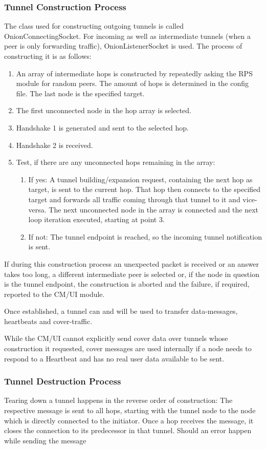 \documentclass{article}
\begin{document}
	\subsubsection{Tunnel Construction Process}
	The class used for constructing outgoing tunnels is called OnionConnectingSocket. For incoming as well as intermediate tunnels (when a peer is only forwarding traffic), OnionListenerSocket is used. The process of constructing it is as follows:
	\begin{enumerate}
		\item An array of intermediate hops is constructed by repeatedly asking the RPS module for random peers. The amount of hops is determined in the config file. The last node is the specified target.
		\item The first unconnected node in the hop array is selected.
		\item Handshake 1 is generated and sent to the selected hop.
		\item Handshake 2 is received.
		\item Test, if there are any unconnected hops remaining in the array: 
		\begin{enumerate}
			\item If yes: A tunnel building/expansion request, containing the next hop as target, is sent to the current hop. That hop then connects to the specified target and forwards all traffic coming through that tunnel to it and vice-versa. The next unconnected node in the array is connected and the next loop iteration executed, starting at point 3.
			\item If not: The tunnel endpoint is reached, so the incoming tunnel notification is sent.
		\end{enumerate}
	\end{enumerate}
	If during this construction process an unexpected packet is received or an answer takes too long, a different intermediate peer is selected or, if the node in question is the tunnel endpoint, the construction is aborted and the failure, if required, reported to the CM/UI module.
	
	Once established, a tunnel can and will be used to transfer data-messages, heartbeats and cover-traffic. 
	
	While the CM/UI cannot explicitly send cover data over tunnels whose construction it requested, cover messages are used internally if a node needs to respond to a Heartbeat and has no real user data available to be sent.
	
	\subsubsection{Tunnel Destruction Process}
	Tearing down a tunnel happens in the reverse order of construction: The respective message is sent to all hops, starting with the tunnel node to the node which is directly connected to the initiator. Once a hop receives the message, it closes the connection to its predecessor in that tunnel. Should an error happen while sending the message
	
\end{document}

